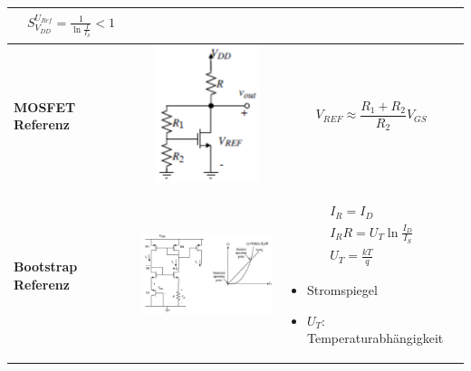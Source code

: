\begin{longtable}{|l|l|l|}
\begin{minipage}{8cm}
\begin{gather}
S_{V_{DD}}^{U_{Ref}}=\frac{1}{\ln{\frac{I}{I_{S}}}}<1
\end{gather}
\end{minipage}
\\
\hline
\begin{minipage}{4cm}
\textbf{MOSFET Referenz}
\end{minipage}
&
\begin{minipage}{6cm}
\includegraphics[width=4cm, height = 4cm]{pictures/mosfetReferenz}
\end{minipage}
&
\begin{minipage}{8cm}
\begin{equation}
V_{REF}\approx \frac{R_{1}+R_{2}}{R_{2}}V_{GS}
\end{equation}
\end{minipage}
\\
\hline
\begin{minipage}{4cm}
\textbf{Bootstrap Referenz}
\end{minipage}
&
\begin{minipage}{6cm}
\includegraphics[width=6cm, height = 4cm]{pictures/bootstrapReferenz}
\end{minipage}
&
\begin{minipage}{8cm}
\begin{gather}
I_{R}=I_{D}\\
I_{R}R=U_{T}\ln{\frac{I_{D}}{I_{S}}}\\
U_{T}=\frac{kT}{q}
\end{gather}
\begin{itemize}
  \item Stromspiegel
  \item $U_{T}$: Temperaturabhängigkeit
\end{itemize}

\end{minipage}
\end{longtable}
